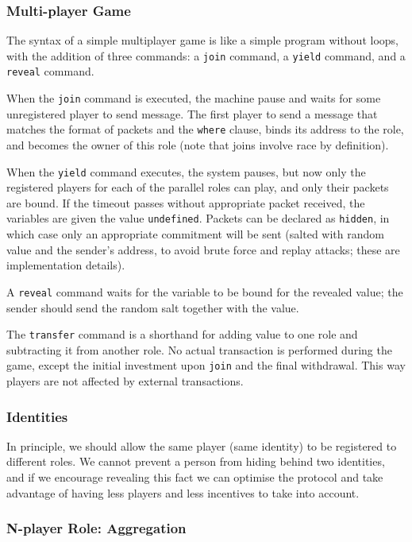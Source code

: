 \documentclass[acmsmall,review,anonymous]{acmart}\settopmatter{printfolios=true,printccs=false,printacmref=false}
\begin{document}
\subsubsection{Multi-player Game}
The syntax of a simple multiplayer game is like a simple program without loops, with the addition of three commands: a \texttt{join} command, a \texttt{yield} command, and a \texttt{reveal} command.

When the \texttt{join} command is executed, the machine pause and waits for some unregistered player to send message. The first player to send a message that matches the format of packets and the \texttt{where} clause, binds its address to the role, and becomes the owner of this role (note that joins involve race by definition).

When the \texttt{yield} command executes, the system pauses, but now only the registered players for each of the parallel roles can play, and only their packets are bound. If the timeout passes without appropriate packet received, the variables are given the value \texttt{undefined}. Packets can be declared as \texttt{hidden}, in which case only an appropriate commitment will be sent (salted with random value and the sender's address, to avoid brute force and replay attacks; these are implementation details).

A \texttt{reveal} command waits for the variable to be bound for the revealed value; the sender should send the random salt together with the value.

The \texttt{transfer} command is a shorthand for adding value to one role and subtracting it from another role. No actual transaction is performed during the game, except the initial investment upon \texttt{join} and the final withdrawal. This way players are not affected by external transactions.

\subsubsection{Identities} In principle, we should allow the same player (same identity) to be registered to different roles. We cannot prevent a person from hiding behind two identities, and if we encourage revealing this fact we can optimise the protocol and take advantage of having less players and less incentives to take into account.

\subsubsection{N-player Role: Aggregation}
\end{document}
